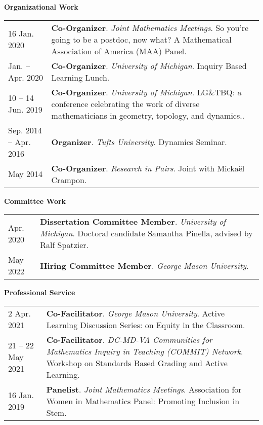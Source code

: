     \vspace{-1em}
    

    \textbf{\large Organizational Work}
    
    \begin{center}
    {
    \renewcommand{\arraystretch}{1.2}
    \begin{longtable}{p{}  p{}}
    16 Jan.  2020 & \textbf{Co-Organizer}. \textit{Joint Mathematics Meetings}.  So you're going to be a postdoc, now what? A Mathematical Association of America (MAA) Panel.  \\ 
 Jan.  --  Apr.  2020 & \textbf{Co-Organizer}. \textit{University of Michigan}.  Inquiry Based Learning Lunch.  \\ 
10  -- 14 Jun.  2019 & \textbf{Co-Organizer}. \textit{University of Michigan}.  LG\&TBQ: a conference celebrating the work of diverse mathematicians
in geometry, topology, and dynamics..  \\ 
 Sep.  2014 --  Apr.  2016 & \textbf{Organizer}. \textit{Tufts University}.  Dynamics Seminar.  \\ 
 May  2014 & \textbf{Co-Organizer}. \textit{Research in Pairs}.  Joint with Micka\"el Crampon.  
    \end{longtable}
    } 
    \end{center}

    \vspace{-1em}
    

    \textbf{\large Committee Work}
    
    \begin{center}
    {
    \renewcommand{\arraystretch}{1.2}
    \begin{longtable}{p{}  p{}}
     Apr.  2020 & \textbf{Dissertation Committee Member}. \textit{University of Michigan}.  Doctoral candidate Samantha Pinella, advised by Ralf Spatzier.  \\ 
 May  2022 & \textbf{Hiring Committee Member}. \textit{George Mason University}.  
    \end{longtable}
    } 
    \end{center}

    \vspace{-1em}
    

    \textbf{\large Professional Service}
    
    \begin{center}
    {
    \renewcommand{\arraystretch}{1.2}
    \begin{longtable}{p{}  p{}}
    2 Apr.  2021 & \textbf{Co-Facilitator}. \textit{George Mason University}.  Active Learning Discussion Series: on Equity in the Classroom.  \\ 
21  -- 22 May  2021 & \textbf{Co-Facilitator}. \textit{DC-MD-VA Communities for Mathematics Inquiry in Teaching (COMMIT) Network}.  Workshop on Standards Based Grading and Active Learning.  \\ 
16 Jan.  2019 & \textbf{Panelist}. \textit{Joint Mathematics Meetings}.  Association for Women in Mathematics Panel: Promoting Inclusion in Stem.  
    \end{longtable}
    } 
    \end{center}

